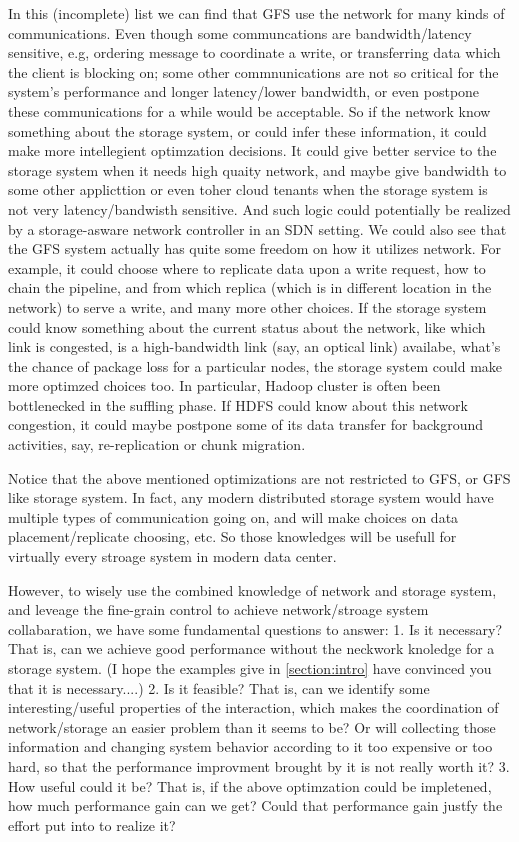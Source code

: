 In this (incomplete) list we can find that GFS use the network for many kinds of communications. Even though some communcations are bandwidth/latency sensitive, e.g, ordering message to coordinate a write, or transferring data which the client is blocking on; some other commnunications are not so critical for the system's performance and longer latency/lower bandwidth, or even postpone these communications for a while would be acceptable. So if the network know something about the storage system, or could infer these information, it could make more intellegient optimzation decisions. It could give better service to the storage system when it needs high quaity network, and maybe give bandwidth to some other applicttion or even toher cloud tenants when the storage system is not very latency/bandwisth sensitive.  And such logic could potentially be realized by a storage-asware network controller in an SDN setting. We could also see that the GFS system actually has quite some freedom on how it utilizes network. For example, it could choose where to replicate data upon a write request, how to chain the pipeline, and from which replica (which is in different location in the network) to serve a write, and many more other choices. If the storage system could know something about the current status about the network, like which link is congested, is a high-bandwidth link (say, an optical link) availabe, what's the chance of package loss for a particular nodes, the storage system could make more optimzed choices too. In particular, Hadoop cluster is often been bottlenecked in the suffling phase. If HDFS could know about this network congestion, it could maybe postpone some of its data transfer for background activities, say, re-replication or chunk migration.

Notice that the above mentioned optimizations are not restricted to GFS, or GFS like storage system. In fact, any modern distributed storage system would have multiple types of communication going on, and will make choices on data placement/replicate choosing, etc. So those knowledges will be usefull for virtually every stroage system in modern data center.

However, to wisely use the combined knowledge of network and storage system, and leveage the fine-grain control to achieve network/stroage system collabaration, we have some fundamental questions to answer:
1. Is it necessary? That is, can we achieve good performance without the neckwork knoledge for a storage system. (I hope the examples give in \ref{section:intro} have convinced you that it is necessary....)
2. Is it feasible? That is, can we identify some interesting/useful properties of the interaction, which makes the coordination of network/storage an easier problem than it seems to be? Or will collecting those information and changing system behavior according to it too expensive or too hard, so that the performance improvment brought by it is not really worth it?
3. How useful could it be? That is, if the above optimzation could be impletened, how much performance gain can we get? Could that performance gain justfy the effort put into to realize it?

